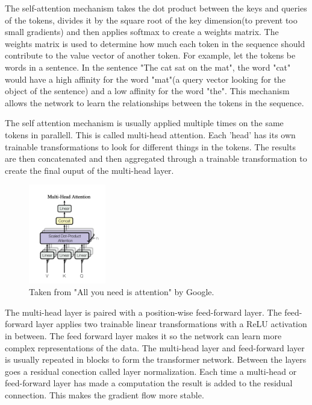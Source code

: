\documentclass[11pt]{article}
\begin{document}
The self-attention mechanism takes the dot product between the keys and queries of the tokens, divides it by the square root of the key dimension(to prevent too small gradients) and then applies softmax to create a weights matrix. The weights matrix is used to determine how much each token in the sequence should contribute to the value vector of another token. For example, let the tokens be words in a sentence. In the sentence "The cat sat on the mat", the word "cat" would have a high affinity for the word "mat"(a query vector looking for the object of the sentence) and a low affinity for the word "the". This mechanism allows the network to learn the relationships between the tokens in the sequence.

The self attention mechanism is usually applied multiple times on the same tokens in parallell. This is called multi-head attention. Each 'head' has its own trainable transformations to look for different things in the tokens. The results are then concatenated and then aggregated through a trainable transformation to create the final ouput of the multi-head layer.

\begin{figure}[h]
\centering
\includegraphics[width=0.3\textwidth]{multi-head.png}
\caption{Taken from "All you need is attention" by Google. }
\end{figure}

The multi-head layer is paired with a position-wise feed-forward layer. The feed-forward layer applies two trainable linear transformations with a ReLU activation in between. The feed forward layer makes it so the network can learn more complex representations of the data. The multi-head layer and feed-forward layer is usually repeated in blocks to form the transformer network. Between the layers goes a residual conection called layer normalization. Each time a multi-head or feed-forward layer has made a computation the result is added to the residual connection. This makes the gradient flow more stable.
\end{document}
